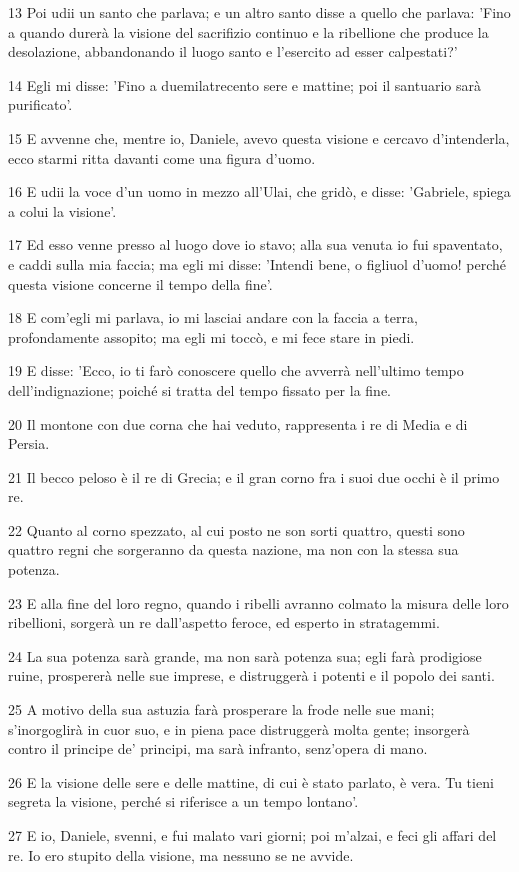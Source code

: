 \par 13 Poi udii un santo che parlava; e un altro santo disse a quello che parlava: 'Fino a quando durerà la visione del sacrifizio continuo e la ribellione che produce la desolazione, abbandonando il luogo santo e l'esercito ad esser calpestati?'
\par 14 Egli mi disse: 'Fino a duemilatrecento sere e mattine; poi il santuario sarà purificato'.
\par 15 E avvenne che, mentre io, Daniele, avevo questa visione e cercavo d'intenderla, ecco starmi ritta davanti come una figura d'uomo.
\par 16 E udii la voce d'un uomo in mezzo all'Ulai, che gridò, e disse: 'Gabriele, spiega a colui la visione'.
\par 17 Ed esso venne presso al luogo dove io stavo; alla sua venuta io fui spaventato, e caddi sulla mia faccia; ma egli mi disse: 'Intendi bene, o figliuol d'uomo! perché questa visione concerne il tempo della fine'.
\par 18 E com'egli mi parlava, io mi lasciai andare con la faccia a terra, profondamente assopito; ma egli mi toccò, e mi fece stare in piedi.
\par 19 E disse: 'Ecco, io ti farò conoscere quello che avverrà nell'ultimo tempo dell'indignazione; poiché si tratta del tempo fissato per la fine.
\par 20 Il montone con due corna che hai veduto, rappresenta i re di Media e di Persia.
\par 21 Il becco peloso è il re di Grecia; e il gran corno fra i suoi due occhi è il primo re.
\par 22 Quanto al corno spezzato, al cui posto ne son sorti quattro, questi sono quattro regni che sorgeranno da questa nazione, ma non con la stessa sua potenza.
\par 23 E alla fine del loro regno, quando i ribelli avranno colmato la misura delle loro ribellioni, sorgerà un re dall'aspetto feroce, ed esperto in stratagemmi.
\par 24 La sua potenza sarà grande, ma non sarà potenza sua; egli farà prodigiose ruine, prospererà nelle sue imprese, e distruggerà i potenti e il popolo dei santi.
\par 25 A motivo della sua astuzia farà prosperare la frode nelle sue mani; s'inorgoglirà in cuor suo, e in piena pace distruggerà molta gente; insorgerà contro il principe de' principi, ma sarà infranto, senz'opera di mano.
\par 26 E la visione delle sere e delle mattine, di cui è stato parlato, è vera. Tu tieni segreta la visione, perché si riferisce a un tempo lontano'.
\par 27 E io, Daniele, svenni, e fui malato vari giorni; poi m'alzai, e feci gli affari del re. Io ero stupito della visione, ma nessuno se ne avvide.


